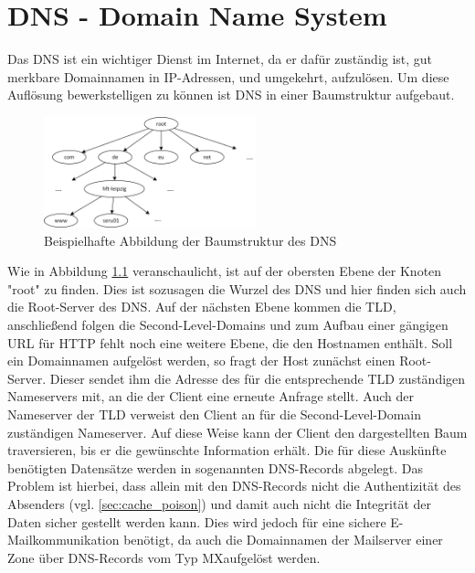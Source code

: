\documentclass  [paper=a4,
				fontsize=12pt,
				listof=totoc,
				bibliography=totoc
				]{scrreprt}
\begin{document}
	\chapter{DNS - Domain Name System}
	\label{chap:dns}
		Das \ac{DNS} ist ein wichtiger Dienst im Internet, da er dafür zuständig ist, gut merkbare Domainnamen in \ac{IP}-Adressen, und umgekehrt, aufzulösen.
		Um diese Auflösung bewerkstelligen zu können ist \ac{DNS} in einer Baumstruktur aufgebaut.
		
		\begin{figure}
			\vspace{-12pt}
			\centering
			\includegraphics[width=0.55\textwidth]{images/Baumstruktur_DNS.png}
			\caption[Baumstruktur des DNS]{Beispielhafte Abbildung der Baumstruktur des \ac{DNS}\footnotemark}
			\label{img:baumstruktur_dns}
			\vspace{-12pt}
		\end{figure}
		
		Wie in Abbildung \ref{img:baumstruktur_dns} veranschaulicht, ist auf der obersten Ebene der Knoten "root" zu finden.
		Dies ist sozusagen die Wurzel des \ac{DNS} und hier finden sich auch die Root-Server des \ac{DNS}.
		Auf der nächsten Ebene kommen die \ac{TLD}, anschließend folgen die Second-Level-Domains und zum Aufbau einer gängigen \ac{URL} für \ac{HTTP} fehlt noch eine weitere Ebene, die den Hostnamen enthält.
		Soll ein Domainnamen aufgelöst werden, so fragt der Host zunächst einen Root-Server.
		Dieser sendet ihm die Adresse des für die entsprechende \ac{TLD} zuständigen Nameservers mit, an die der Client eine erneute Anfrage stellt.
		Auch der Nameserver der \ac{TLD} verweist den Client an für die Second-Level-Domain zuständigen Nameserver.
		Auf diese Weise kann der Client den dargestellten Baum traversieren, bis er die gewünschte Information erhält.
		Die für diese Auskünfte benötigten Datensätze werden in sogenannten \ac{DNS}-Records abgelegt.
		Das Problem ist hierbei, dass allein mit den \ac{DNS}-Records nicht die Authentizität des Absenders (vgl. \ref{sec:cache_poison}) und damit auch nicht die Integrität der Daten sicher gestellt werden kann.
		Dies wird jedoch für eine sichere E-Mailkommunikation benötigt, da auch die Domainnamen der Mailserver einer Zone über \ac{DNS}-Records vom Typ \glqq MX\grqq aufgelöst werden.
\end{document}
